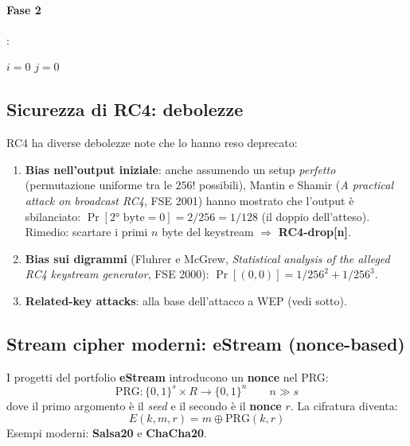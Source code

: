 
\paragraph{Fase 2}:
\begin{algorithm}
\caption{Generazione del keystream}
$i = 0$\;
$j = 0$\;
\end{algorithm}
  

\subsection{Sicurezza di RC4: debolezze}
RC4 ha diverse debolezze note che lo hanno reso deprecato:
\begin{enumerate}
  \item \textbf{Bias nell'output iniziale}: anche assumendo un setup \emph{perfetto} (permutazione uniforme tra le $256!$ possibili), Mantin e Shamir (\textit{A practical attack on broadcast RC4}, FSE 2001) hanno mostrato che l'output è sbilanciato: $\Pr[\text{2° byte} = 0] = 2/256 = 1/128$ (il doppio dell'atteso). Rimedio: scartare i primi $n$ byte del keystream $\Rightarrow$ \textbf{RC4-drop[n]}.
  \item \textbf{Bias sui digrammi} (Fluhrer e McGrew, \textit{Statistical analysis of the alleged RC4 keystream generator}, FSE 2000): $\Pr[(0,0)] = 1/256^2 + 1/256^3$.
  \item \textbf{Related-key attacks}: alla base dell'attacco a WEP (vedi sotto).
\end{enumerate}

\subsection{Stream cipher moderni: eStream (nonce-based)}
I progetti del portfolio \textbf{eStream} introducono un \textbf{nonce} nel PRG:
\[
  \mathrm{PRG}: \{0,1\}^s \times R \to \{0,1\}^n \qquad n \gg s
\]
dove il primo argomento è il \textit{seed} e il secondo è il \textbf{nonce} $r$.
La cifratura diventa:
\[
  E(k, m, r) = m \oplus \mathrm{PRG}(k, r)
\]
Esempi moderni: \textbf{Salsa20} e \textbf{ChaCha20}.

